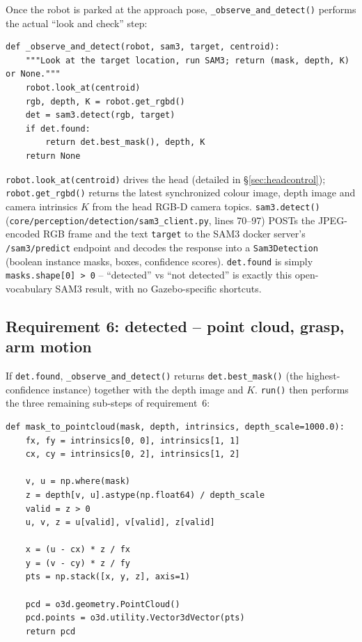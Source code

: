 \documentclass[11pt]{article}
\begin{document}
Once the robot is parked at the approach pose, \texttt{\_observe\_and\_detect()}
performs the actual ``look and check'' step:

\begin{lstlisting}[caption={\texttt{search\_and\_fetch.py}: \texttt{\_observe\_and\_detect()} (lines 64--72)}]
def _observe_and_detect(robot, sam3, target, centroid):
    """Look at the target location, run SAM3; return (mask, depth, K) or None."""
    robot.look_at(centroid)
    rgb, depth, K = robot.get_rgbd()
    det = sam3.detect(rgb, target)
    if det.found:
        return det.best_mask(), depth, K
    return None
\end{lstlisting}

\texttt{robot.look\_at(centroid)} drives the head (detailed in
\S\ref{sec:headcontrol}); \texttt{robot.get\_rgbd()} returns the latest
synchronized colour image, depth image and camera intrinsics $K$ from the
head RGB-D camera topics. \texttt{sam3.detect()}
(\texttt{core/perception/detection/sam3\_client.py}, lines 70--97) POSTs the
JPEG-encoded RGB frame and the text \texttt{target} to the SAM3 docker
server's \texttt{/sam3/predict} endpoint and decodes the response into a
\texttt{Sam3Detection} (boolean instance masks, boxes, confidence scores).
\texttt{det.found} is simply \texttt{masks.shape[0] > 0} -- ``detected'' vs
``not detected'' is exactly this open-vocabulary SAM3 result, with no
Gazebo-specific shortcuts.

\subsection{Requirement 6: detected -- point cloud, grasp, arm motion}
\label{sec:grasp}

If \texttt{det.found}, \texttt{\_observe\_and\_detect()} returns
\texttt{det.best\_mask()} (the highest-confidence instance) together with the
depth image and $K$. \texttt{run()} then performs the three remaining
sub-steps of requirement~6:

\begin{lstlisting}[caption={\texttt{sam3\_client.py}: \texttt{mask\_to\_pointcloud()} -- 2D mask + depth $\to$ 3D points in the camera frame (lines 100--130)}]
def mask_to_pointcloud(mask, depth, intrinsics, depth_scale=1000.0):
    fx, fy = intrinsics[0, 0], intrinsics[1, 1]
    cx, cy = intrinsics[0, 2], intrinsics[1, 2]

    v, u = np.where(mask)
    z = depth[v, u].astype(np.float64) / depth_scale
    valid = z > 0
    u, v, z = u[valid], v[valid], z[valid]

    x = (u - cx) * z / fx
    y = (v - cy) * z / fy
    pts = np.stack([x, y, z], axis=1)

    pcd = o3d.geometry.PointCloud()
    pcd.points = o3d.utility.Vector3dVector(pts)
    return pcd
\end{lstlisting}
\end{document}
